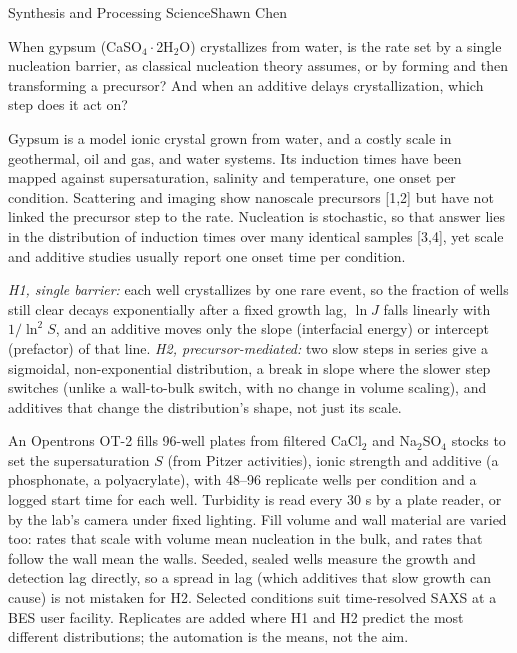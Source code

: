 \documentclass[11pt,letterpaper]{article}
\begin{document}
  {Synthesis and Processing Science}{Shawn Chen}

 When gypsum (CaSO$_4\cdot$2H$_2$O) crystallizes from water, is the rate set by
a single nucleation barrier, as classical nucleation theory assumes, or by forming and then
transforming a precursor? And when an additive delays crystallization, which step does it act on?

 Gypsum is a model ionic crystal grown from water, and a costly scale in
geothermal, oil and gas, and water systems. Its induction times have been mapped against
supersaturation, salinity and temperature, one onset per condition. Scattering and imaging show
nanoscale precursors [1,2] but have not linked the precursor step to the rate. Nucleation is
stochastic, so that answer lies in the distribution of induction times over many identical samples
[3,4], yet scale and additive studies usually report one onset time per condition.

 \emph{H1, single barrier:} each well crystallizes by one rare event, so the
fraction of wells still clear decays exponentially after a fixed growth lag, $\ln J$ falls linearly
with $1/\ln^2 S$, and an additive moves only the slope (interfacial energy) or intercept (prefactor) of that line.
\emph{H2, precursor-mediated:} two slow steps in series give a sigmoidal, non-exponential
distribution, a break in slope where the slower step switches (unlike a wall-to-bulk switch, with no change in
volume scaling), and additives that change the distribution's shape, not just its scale.

 An Opentrons OT-2 fills 96-well plates from filtered CaCl$_2$ and Na$_2$SO$_4$
stocks to set the supersaturation $S$ (from Pitzer activities), ionic strength and additive (a
phosphonate, a polyacrylate), with 48--96 replicate wells per condition and a logged start
time for each well. Turbidity is read every 30 s by a plate reader, or by the lab's camera under
fixed lighting. Fill volume and wall material are varied too: rates that scale with volume mean nucleation in the
bulk, and rates that follow the wall mean the walls. Seeded, sealed wells measure the growth and
detection lag directly, so a spread in lag (which additives that slow growth can cause) is not
mistaken for H2. Selected conditions suit time-resolved SAXS at a BES user facility. Replicates are added where H1 and H2 predict the most
different distributions; the automation is the means, not the aim.
\end{document}
